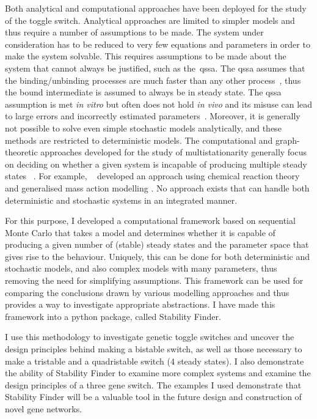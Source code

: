 Both analytical and computational approaches have been deployed for the study of the toggle switch. Analytical approaches are limited to simpler models and thus require a number of assumptions to be made. The system under consideration has to be reduced to very few equations and parameters in order to make the system solvable. This requires assumptions to be made about the system that cannot always be justified, such as the~\acrfull{qssa}. The \acrshort{qssa} assumes that the binding/unbinding processes are much faster than any other process~\autocite{Loinger:2007vma}, thus the bound intermediate is assumed to always be in steady state. The \acrshort{qssa} assumption is met \textit{in vitro} but often does not hold \textit{in vivo} and its misuse can lead to large errors and incorrectly estimated parameters~\autocite{Pedersen:2007ke}. Moreover, it is generally not possible to solve even simple stochastic models analytically, and these methods are restricted to deterministic models. The computational and graph-theoretic approaches developed for the study of multistationarity generally focus on deciding on whether a given system is incapable of producing multiple steady states ~\autocite{Conradi:2007jo, Banaji:2010fh,Feliu:2013dz}. For example, ~\textcite{Feliu:2013dz} developed an approach using chemical reaction theory and generalised mass action modelling \autocite{Feliu:2013dz}. No approach exists that can handle both deterministic and stochastic systems in an integrated manner.

For this purpose, I developed a computational framework based on sequential Monte Carlo that takes a model and determines whether it is capable of producing a given number of (stable) steady states and the parameter space that gives rise to the behaviour. Uniquely, this can be done for both deterministic and stochastic models, and also complex models with many parameters, thus removing the need for simplifying assumptions. This framework can be used for comparing the conclusions drawn by various modelling approaches and thus provides a way to investigate appropriate abstractions. I have made this framework into a python package, called Stability Finder. 

I use this methodology to investigate genetic toggle switches and uncover the design principles behind making a bistable switch, as well as those necessary to make a tristable and a quadristable switch (4 steady states). I also demonstrate the ability of Stability Finder to examine more complex systems and examine the design principles of a three gene switch. The examples I used demonstrate that Stability Finder will be a valuable tool in the future design and construction of novel gene networks. 

